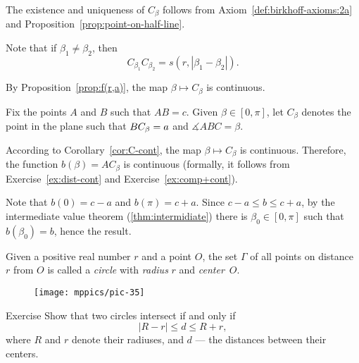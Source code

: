 The existence and uniqueness of $C_\beta$ follows from Axiom~\ref{def:birkhoff-axioms:2a} and Proposition~\ref{prop:point-on-half-line}.

Note that if $\beta_1\ne\beta_2$, then
$$C_{\beta_1}C_{\beta_2}=s(r,|\beta_1-\beta_2|).$$

By Proposition~\ref{prop:f(r,a)}, the map $\beta\mapsto C_\beta$ is continuous.
\qeds





\label{page:proof:thm:abc}
Fix the points $A$ and $B$ such that $AB=c$.
Given $\beta\in [0,\pi]$,
let $C_\beta$ denotes the point in the plane such that $BC_\beta\z=a$ and $\measuredangle ABC=\beta$.

According to Corollary~\ref{cor:C-cont},
the map
$\beta\mapsto C_\beta$ is continuous.
Therefore, the function $b(\beta)=AC_\beta$ is continuous
(formally, it follows from Exercise~\ref{ex:dist-cont} and Exercise~\ref{ex:comp+cont}).

Note that $b(0)=c-a$ and $b(\pi)=c+a$.
Since $c-a\le b\le c+a$,
by the intermediate value theorem (\ref{thm:intermidiate})
there is $\beta_0\in[0,\pi]$ such that
$b(\beta_0)=b$,
hence the result. 
\qeds

Given a positive real number $r$ and a point $O$,
the set $\Gamma$ of all points on distance $r$ from $O$ is called a \emph{circle} 
with \emph{radius} $r$ and \emph{center}~$O$.

\begin{wrapfigure}{r}{40mm}
\centering
\texttt{[image: mppics/pic-35]}
\end{wrapfigure}

\begin{thm}{Exercise}\label{ex:intersecting-circles-3}
Show that two circles intersect if and only if 
\[|R-r|\le d\le R+r,\]
where $R$ and $r$ denote their radiuses, and $d$ ---  the distances between their centers.
\end{thm}

